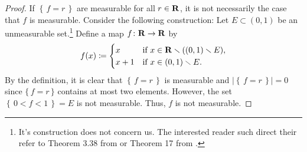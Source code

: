 \begin{proof}
If $\left\{\,f=r\,\right\}$ are measurable for all $r\in\mathbf{R}$, it is not
necessarily the case that $f$ is measurable. Consider the following
construction: Let $E\subset(0,1)$ be an unmeasurable set.\footnote{It's
  construction does not concern us. The interested reader such direct their
  refer to Theorem 3.38 from \cite[Ch.\@ 3, p.\@ 57-58]{wheeden-zygmund} or
  Theorem 17 from \cite[Ch.\@ 2\S 7, p.\@ 48]{royden}.} Define a map
$f\colon\mathbf{R}\to\mathbf{R}$ by
\begin{equation}
\label{eq:prep:1:11}
f(x)\coloneqq
\begin{cases}
x&\text{if $x\in\mathbf{R}\smallsetminus((0,1)\smallsetminus E)$},\\
x+1&\text{if $x\in (0,1)\smallsetminus E$.}
\end{cases}
\end{equation}
By the definition, it is clear that $\left\{\,f=r\,\right\}$ is measurable
and $\left|\left\{\,f=r\,\right\}\right|=0$ since $\{\,f=r\,\}$ contains at
most two elements. However, the set $\left\{\,0<f<1\,\right\}=E$ is not
measurable. Thus, $f$ is not measurable.
\end{proof}

